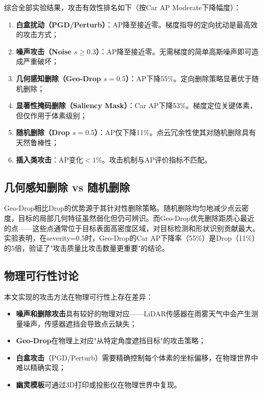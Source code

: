 ﻿\documentclass[12pt,a4paper]{ctexart}
\begin{document}
综合全部实验结果，攻击有效性排名如下（按Car AP Moderate下降幅度）：

\begin{enumerate}
  \item \textbf{白盒扰动（PGD/Perturb）}：AP降至接近零。梯度指导的定向扰动是最高效的攻击方式；
  \item \textbf{噪声攻击（Noise $s \geq 0.3$）}：AP降至接近零。无需梯度的简单高斯噪声即可造成严重破坏；
  \item \textbf{几何感知删除（Geo-Drop $s=0.5$）}：AP下降55\%。定向删除策略显著优于随机删除；
  \item \textbf{显著性掩码删除（Saliency Mask）}：Car AP下降53\%。梯度定位关键体素，但仅作用于体素级别；
  \item \textbf{随机删除（Drop $s=0.5$）}：AP仅下降11\%。点云冗余性使其对随机删除具有天然鲁棒性；
  \item \textbf{插入类攻击}：AP变化$< 1$\%。攻击机制与AP评价指标不匹配。
\end{enumerate}

\subsection{几何感知删除 vs 随机删除}

Geo-Drop相比Drop的优势源于其针对性删除策略。随机删除均匀地减少点云密度，目标的局部几何特征虽然弱化但仍可辨识。而Geo-Drop优先删除距质心最近的点——这些点通常位于目标表面高密度区域，对目标检测和形状识别贡献最大。实验表明，在severity=0.5时，Geo-Drop的Car AP下降率（55\%）是Drop（11\%）的5倍，验证了"攻击质量比攻击数量更重要"的结论。

\subsection{物理可行性讨论}

本文实现的攻击方法在物理可行性上存在差异：
\begin{itemize}
  \item \textbf{噪声和删除攻击}具有较好的物理对应——LiDAR传感器在雨雾天气中会产生测量噪声，传感器遮挡会导致点云缺失；
  \item \textbf{Geo-Drop}在物理上对应"从特定角度遮挡目标"的攻击策略；
  \item \textbf{白盒攻击}（PGD/Perturb）需要精确控制每个体素的坐标偏移，在物理世界中难以精确实现；
  \item \textbf{幽灵模板}可通过3D打印或投影仪在物理世界中复现。
\end{itemize}
\end{document}
